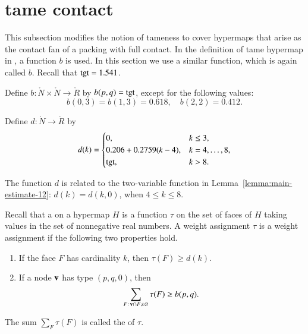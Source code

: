 \documentclass{llncs}
\def\op#1{{\hbox{#1}}}
\begin{document}
\section{tame contact}

This subsection modifies the notion of tameness to cover hypermaps
that arise as the contact fan of a packing with full contact.  In the
definition of tame hypermap in \cite{dsp}, a function $b$
is used.  In this section we use a similar function,  which is
again called $b$.   Recall that $\op{tgt}=1.541$.  %
%

\begin{definition}[b]
  Define $b:\ring{N}\times \ring{N}\to \ring{R}$ by
  $b\pqr{(p,q)}=\op{tgt}$, except for the following values:
\[
b(0,3)=b(1,3)=0.618,\quad b(2,2)=0.412.
\]
\end{definition}
%

\begin{definition}[d]
Define $d:\ring{N}\to \ring{R}$ by
\[d(k) = \begin{cases}
0, & k\le 3, \\
0.206 + 0.2759 (k-4),& k=4,\ldots,8,\\
\op{tgt},& k>8.\\
\end{cases}
\]
\end{definition}
%

The function $d$ is related to the two-variable function in
Lemma~\ref{lemma:main-estimate-12}: $d(k) = d(k,0)$, when $4\le k\le
8$.

%
%
\begin{definition}
%
  Recall that a  
on a hypermap $H$ is a
  function $\tau$ on the set of faces of $H$ taking values in the set
  of nonnegative real numbers. A weight assignment $\tau$
is a 
  weight assignment if the following two properties hold.
%
\begin{enumerate}
\item If the face $F$ has cardinality $k$, then
$\tau(F) \ge d(k)$.
\item If a node ${\mathbf v}$ has type $(p,q,0)$, then
  \[\sum_{F:\,{\mathbf v}\cap F\ne\varnothing} \tau(F) \ge
    b{(p,q)}.\]
\end{enumerate}
The sum $\sum_F \tau(F)$ is called the  of $\tau$.
\end{definition}
%
\end{document}
